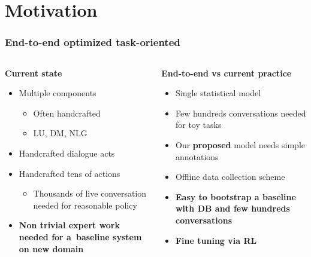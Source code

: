 \documentclass[10pt, compress,british,xcolor={svgnames,dvipsnames,x11names},trans]{beamer}
\begin{document}
\section{Motivation}  %

\begin{frame}\frametitle{End-to-end optimized task-oriented}
\begin{columns}
\begin{column}{0.45\textwidth}
    {\bf Current state} \\
    \begin{itemize}
        \item Multiple components
            \begin{itemize}
                \item Often handcrafted
                \item LU, DM, NLG 
            \end{itemize}
        \item Handcrafted dialogue acts
        \item Handcrafted tens of actions
            \begin{itemize}
                \item Thousands of live conversation needed for reasonable policy~\cite{gasic}
            \end{itemize}
        \item {\bf \color{red} Non trivial expert work needed for a~baseline system on new domain}
    \end{itemize}
\end{column}
\begin{column}{0.45\textwidth}
    {\bf End-to-end vs current practice}
    \begin{itemize}
        \item Single statistical model
        \item Few hundreds conversations needed for toy tasks~\cite{Wen}
        \item Our {\bf proposed} model needs simple annotations
        \item {\color{darkgreen} Offline data collection scheme}~\cite{Wen,Wochat}
        \item {\bf \color{darkgreen} Easy to bootstrap a baseline with DB and few hundreds conversations}
        \item {\bf \color{darkgreen} Fine tuning via RL}
    \end{itemize}
\end{column}
\end{columns}
\end{frame}
\end{document}
